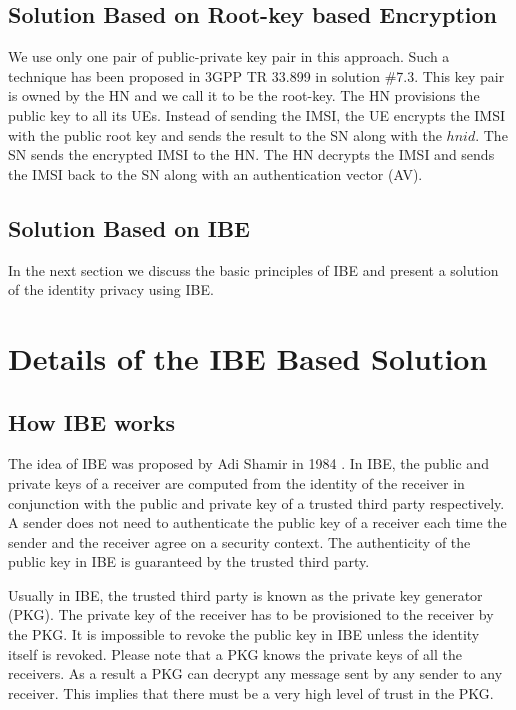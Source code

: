 \documentclass{llncs} %
\begin{document}
\subsection{Solution Based on Root-key based Encryption} 
\label{sub_sec:solution_root-key}
We use only one pair of public-private key pair in this approach. Such a technique has been proposed in 3GPP TR 33.899 in solution \#7.3. This key pair is owned by the HN and we call it to be the root-key. The HN provisions the public key to all its UEs.  Instead of sending the IMSI, the UE encrypts the IMSI with the public root key and sends the result to the SN along with the $hnid$. The SN sends the encrypted IMSI to the HN. The HN decrypts the IMSI and sends the IMSI back to the SN along with an authentication vector (AV).

\subsection{Solution Based on IBE}
In the next section we discuss the basic principles of IBE and present a solution of the identity privacy using IBE. 

\section{Details of the IBE Based Solution} 
\label{sec:solutions_based_on_IBE}
\subsection{How IBE works}
The idea of IBE was proposed by Adi Shamir in 1984 \cite{IBE_shamir}. In IBE, the public and private keys of a receiver are computed from the identity of the receiver in conjunction with the public and private key of a trusted third party respectively. A sender does not need to authenticate the public key of a receiver each time the sender and the receiver agree on a security context. The authenticity of the public key in IBE is guaranteed by the trusted third party. 

Usually in IBE, the trusted third party is known as the private key generator (PKG). The private key of the receiver has to be provisioned to the receiver by the PKG. It is impossible to revoke the public key in IBE unless the identity itself is revoked. Please note that a PKG knows the private keys of all the receivers. As a result a PKG can decrypt any message sent by any sender to any receiver. This implies that there must be a very high level of trust in the PKG.
\end{document}
